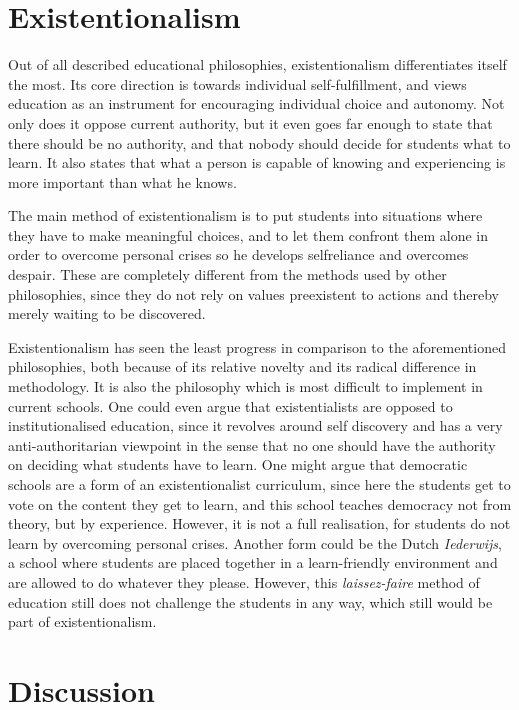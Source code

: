 \section{Existentionalism}

Out of all described educational philosophies, existentionalism differentiates itself the most. Its core direction is towards individual self-fulfillment, and views education as an instrument for encouraging individual choice and autonomy. Not only does it oppose current authority, but it even goes far enough to state that there should be no authority, and that nobody should decide for students what to learn. It also states that what a person is capable of knowing and experiencing is more important than what he knows.

The main method of existentionalism is to put students into situations where they have to make meaningful choices, and to let them confront them alone in order to overcome personal crises so he develops selfreliance and overcomes despair. These are completely different from the methods used by other philosophies, since they do not rely on values preexistent to actions and thereby merely waiting to be discovered.

Existentionalism has seen the least progress in comparison to the aforementioned philosophies, both because of its relative novelty and its radical difference in methodology. It is also the philosophy which is most difficult to implement in current schools. One could even argue that existentialists are opposed to institutionalised education, since it revolves around self discovery and has a very anti-authoritarian viewpoint in the sense that no one should have the authority on deciding what students have to learn. One might argue that democratic schools are a form of an existentionalist curriculum, since here the students get to vote on the content they get to learn, and this school teaches democracy not from theory, but by experience. However, it is not a full realisation, for students do not learn by overcoming personal crises. Another form could be the Dutch \emph{Iederwijs}, a school where students are placed together in a learn-friendly environment and are allowed to do whatever they please. However, this \emph{laissez-faire} method of education still does not challenge the students in any way, which still would be part of existentionalism.

\section{Discussion}

